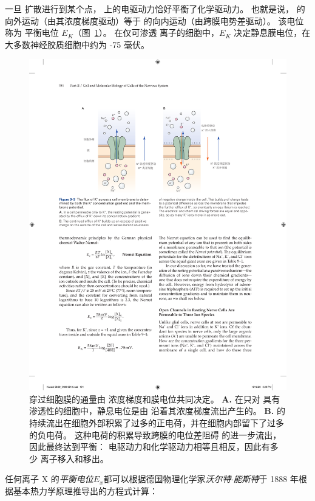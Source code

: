 一旦  扩散进行到某个点， 上的电驱动力恰好平衡了化学驱动力。
也就是说， 的向外运动（由其浓度梯度驱动）等于  的向内运动（由跨膜电势差驱动）。
该电位称为  平衡电位 $E_K$（图~\ref{fig:9_3}）。
在仅可渗透  离子的细胞中，$E_K$ 决定静息膜电位，在大多数神经胶质细胞中约为 -75 毫伏。


\begin{figure}[htbp]
	\centering
	\includegraphics[width=0.9\linewidth]{chap09/fig_9_3}
	\caption{ 穿过细胞膜的通量由  浓度梯度和膜电位共同决定。
		\textbf{A.} 在只对  具有渗透性的细胞中，静息电位是由  沿着其浓度梯度流出产生的。
		\textbf{B.}  的持续流出在细胞外部积累了过多的正电荷，并在细胞内部留下了过多的负电荷。
		这种电荷的积累导致跨膜的电位差阻碍  的进一步流出，因此最终达到平衡：
		电驱动力和化学驱动力相等且相反，因此有多少  离子移入和移出。}
	\label{fig:9_3}
\end{figure}


任何离子 X 的\textit{平衡电位}$E_x$都可以根据德国物理化学家\textit{沃尔特$\cdot$能斯特}于 1888 年根据基本热力学原理推导出的方程式计算：

